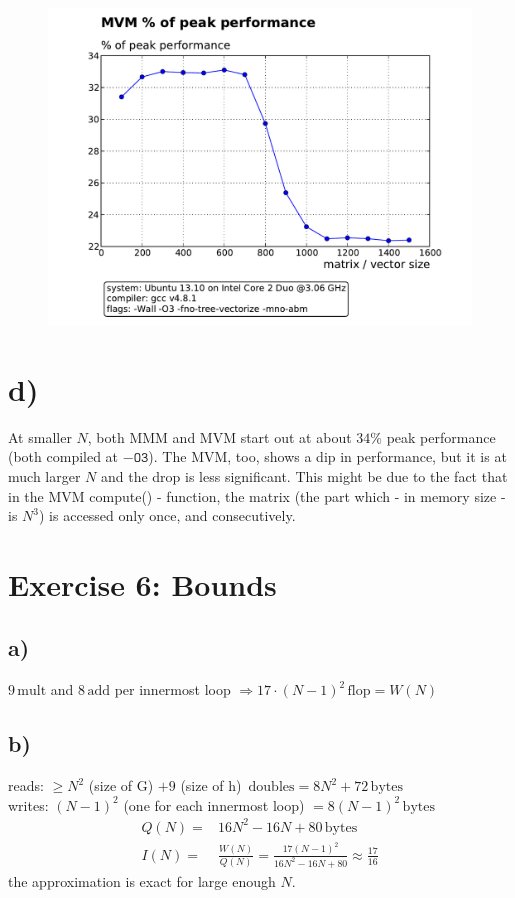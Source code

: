 \documentclass[11pt]{article}
\newcommand{\unit}[1]{\ensuremath{\, \mathrm{#1}}}			%
\begin{document}
			\begin{figure}[H]
				\includegraphics[width = 6in]{MVM_percentageO3.pdf}
			\end{figure}
		\section*{d)}
		At smaller $N$, both MMM and MVM start out at about $34 \%$ peak performance (both compiled at $\mathtt{-O3}$). The MVM, too, shows a dip in performance, but it is at much larger $N$ and the drop is less significant. This might be due to the fact that in the MVM compute() - function, the matrix (the part which - in memory size - is $N^3$) is accessed only once, and consecutively.
		
	\section*{Exercise 6: Bounds}
		\subsection*{a)}
			$9 \unit{mult}$ and $8 \unit{add}$ per innermost loop 
			$ \Rightarrow 17 \cdot (N - 1)^2 \unit{flop} = W(N) $
		\subsection*{b)}
			reads: $\geq N^2$ (size of G) $+ 9$ (size of h) $\unit{doubles} = 8 N^2 + 72 \unit{bytes}$ \\
			writes: $(N - 1)^2$ (one for each innermost loop) $ = 8(N - 1)^2 \unit{bytes}$ 
			\begin{align*}
				Q(N) =& 16 N^2 -16 N + 80 \unit{bytes}\\
				I(N) = & \frac{W(N)}{Q(N)} = \frac{17 (N - 1)^2}{16 N^2 -16 N + 80} \approx \frac{17}{16}
			\end{align*}
		the approximation is exact for large enough $N$.
\end{document}
